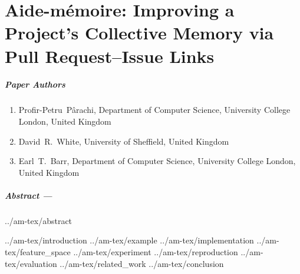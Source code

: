 \chapter{Aide-mémoire: Improving a Project’s Collective Memory via Pull Request--Issue Links}
\label{chapter:am}


\newcommand{\ourtool}{\textsc{A-m}\xspace}
\newcommand{\Ourtool}{\textsc{A-m}\xspace}
\newcommand{\Ourtoollong}{Aide-m\'emoire\xspace}
\newcommand{\ourtoollong}{Aide-m\'emoire\xspace}
\newcommand{\ourMAPresult}{$0.95$\xspace}
\newcommand{\ourMAPresultJava}{$1.00$\xspace}
\newcommand{\RCMAP}{$0.26$\xspace}
\newcommand{\ourHitresult}{$0.86$\xspace}
\newcommand{\ourHitresultJava}{$0.92$\xspace}
\newcommand{\ourPatOneresult}{$94\%$\xspace}
\newcommand{\corpusSize}{213\xspace} %
\newcommand{\excludedDueToSize}{72\xspace}
\newcommand{\projectPage}{\url{https://github.com/PPPI/a-m}}


\paragraph{Paper Authors}%
\begin{enumerate}
    \item[]  Profir-Petru~P\^arachi, Department of Computer Science, University College London, United Kingdom
    \item[] David~R.~White, University of Sheffield, United Kingdom
    \item[] Earl~T.~Barr, Department of Computer Science, University College London, United Kingdom
\end{enumerate}

\paragraph{Abstract ---}
{../am-tex/abstract}

{../am-tex/introduction}
{../am-tex/example}
{../am-tex/implementation}
{../am-tex/feature_space}
{../am-tex/experiment}
{../am-tex/reproduction}
{../am-tex/evaluation}
{../am-tex/related_work}
{../am-tex/conclusion}
